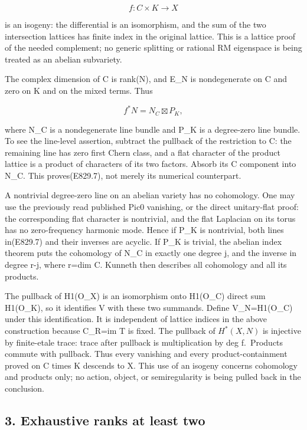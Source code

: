 \[
 f:C\times K\longrightarrow X
 \tag{E829.6}
\]

is an isogeny: the differential is an isomorphism, and the sum of the two
intersection lattices has finite index in the original lattice. This is a
lattice proof of the needed complement; no generic splitting or rational RM
eigenspace is being treated as an abelian subvariety.

The complex dimension of C is rank(N), and E\_N is nondegenerate on C and
zero on K and on the mixed terms. Thus

\[
 f^*N=N_C\boxtimes P_K,
 \tag{E829.7}
\]

where N\_C is a nondegenerate line bundle and P\_K is a degree-zero line
bundle. To see the line-level assertion, subtract the pullback of the
restriction to C: the remaining line has zero first Chern class, and a flat
character of the product lattice is a product of characters of its two
factors. Absorb its C component into N\_C. This proves(E829.7), not merely
its numerical counterpart.

A nontrivial degree-zero line on an abelian variety has no cohomology. One
may use the previously read published Pic0 vanishing, or the direct
unitary-flat proof: the corresponding flat character is nontrivial, and the
flat Laplacian on its torus has no zero-frequency harmonic mode. Hence if
P\_K is nontrivial, both lines in(E829.7) and their inverses are acyclic. If
P\_K is trivial, the abelian index theorem puts the cohomology of N\_C in
exactly one degree j, and the inverse in degree r-j, where r=dim C. Kunneth
then describes all cohomology and all its products.

The pullback of H1(O\_X) is an isomorphism onto H1(O\_C) direct sum
H1(O\_K), so it identifies V with these two summands. Define V\_N=H1(O\_C)
under this identification. It is independent of lattice indices in the above
construction because C\_R=im T is fixed. The pullback of \(H^*(X,N)\) is
injective by finite-etale trace: trace after pullback is multiplication by
deg f.~Products commute with pullback. Thus every vanishing and every
product-containment proved on C times K descends to X. This use of an
isogeny concerns cohomology and products only; no action, object, or
semiregularity is being pulled back in the conclusion.

\subsection{3. Exhaustive ranks at least
two}\label{SF-E829:exhaustive-ranks-at-least-two}

